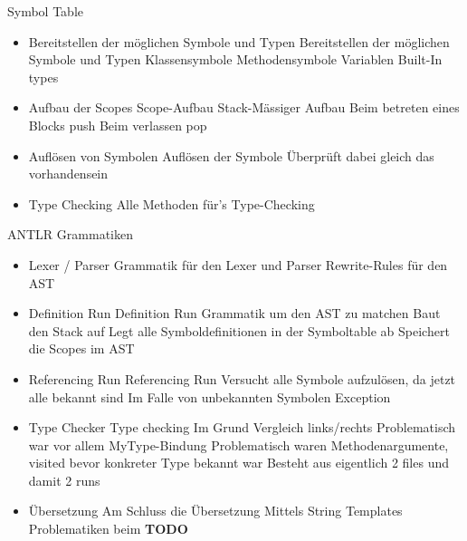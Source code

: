 \begin{frame}[t]{Symbol Table}
	\begin{itemize}[<+->]
		\item Bereitstellen der möglichen Symbole und Typen
		 {Bereitstellen der möglichen Symbole und Typen}
		 {Klassensymbole}
		 {Methodensymbole}
		 {Variablen}
		 {Built-In types}

		\item Aufbau der Scopes 
		 {Scope-Aufbau}
		 {Stack-Mässiger Aufbau}
		 {Beim betreten eines Blocks push}
		 {Beim verlassen pop}

		\item Auflösen von Symbolen
		 {Auflösen der Symbole}
		 {Überprüft dabei gleich das vorhandensein}

		\item Type Checking
		 {Alle Methoden für's Type-Checking}
	\end{itemize}
\end{frame}

\begin{frame}[t]{ANTLR Grammatiken}
	\begin{itemize}[<+->]
		\item Lexer / Parser
		 {Grammatik für den Lexer und Parser}
		 {Rewrite-Rules für den AST}

		\item Definition Run
		 {Definition Run}
		 {Grammatik um den AST zu matchen}
		 {Baut den Stack auf}
		 {Legt alle Symboldefinitionen in der Symboltable ab}
		 {Speichert die Scopes im AST}

		\item Referencing Run
		 {Referencing Run}
		 {Versucht alle Symbole aufzulösen, da jetzt alle bekannt sind}
		 {Im Falle von unbekannten Symbolen Exception}

		\item Type Checker
		 {Type checking}
		 {Im Grund Vergleich links/rechts}
		 {Problematisch war vor allem MyType-Bindung}
		 {Problematisch waren Methodenargumente, visited bevor konkreter Type bekannt war}
		 {Besteht aus eigentlich 2 files und damit 2 runs}

		\item Übersetzung
		 {Am Schluss die Übersetzung}
		 {Mittels String Templates}
		 {Problematiken beim }
		 {\textbf{TODO}}
	\end{itemize}
\end{frame}


